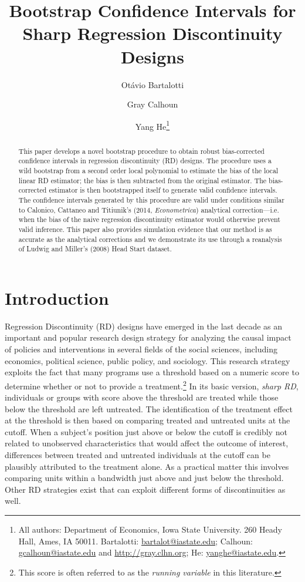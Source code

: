 \documentclass[12pt,fleqn]{article}
\title{Bootstrap Confidence Intervals for Sharp Regression Discontinuity Designs}
\author{Ot\'avio Bartalotti \and Gray Calhoun \and Yang He\thanks{%
  All authors: Department of Economics, Iowa State University.
  260 Heady Hall, Ames, IA 50011.
  Bartalotti: \protect\url{bartalot@iastate.edu};
  Calhoun: \protect\url{gcalhoun@iastate.edu} and
  \protect\url{http://gray.clhn.org};
  He: \protect\url{yanghe@iastate.edu}.}}
\begin{document}
\maketitle

\begin{abstract}\noindent
  This paper develops a novel bootstrap procedure to obtain robust
  bias-corrected confidence intervals in regression discontinuity (RD) designs. The procedure uses a wild bootstrap from a
  second order local polynomial to estimate the bias of the local linear RD
  estimator; the bias is then subtracted from the original estimator. The
  bias-corrected estimator is then bootstrapped itself to generate valid
  confidence intervals. The confidence intervals generated by this procedure
  are valid under conditions similar to Calonico, Cattaneo and Titiunik's
  (2014, \textit{Econometrica}) analytical correction---i.e.  when the bias of
  the naive regression discontinuity estimator would otherwise prevent valid
  inference. This paper also provides simulation evidence that our method is
  as accurate as the analytical corrections and we demonstrate its use through
  a reanalysis of Ludwig and Miller's (2008) Head Start dataset.
\end{abstract}

\section{Introduction}
Regression Discontinuity (RD) designs have emerged in the last decade as an
important and popular research design strategy for analyzing the causal impact
of policies and interventions in several fields of the social sciences,
including economics, political science, public policy, and sociology.  This
research strategy exploits the fact that many programs use a threshold based
on a numeric score to determine whether or not to provide a
treatment.\footnote{This score is often referred to as the \textit{running variable} in this
  literature.}
In its basic version, \textit{sharp RD}, individuals or groups with score
above the threshold are treated while those below the threshold are left
untreated. The identification of the treatment effect at the threshold is then
based on comparing treated and untreated units at the cutoff. When a subject's
position just above or below the cutoff is credibly not related to unobserved
characteristics that would affect the outcome of interest, differences between
treated and untreated individuals at the cutoff can be plausibly attributed to
the treatment alone. As a practical matter this involves comparing units
within a bandwidth just above and just below the threshold. Other RD
strategies exist that can exploit different forms of discontinuities as well.
\end{document}
